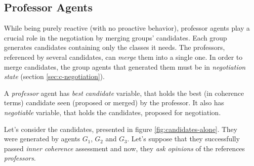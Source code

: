 \documentclass[../../ThesisDoc]{subfiles}
\begin{document}
\providecommand{\rootdir}{../..}




\subsection{Professor Agents}

While being purely reactive (with no proactive behavior), professor agents
play a crucial role in the negotiation by merging groups' candidates.
Each group generates candidates containing only the classes it needs.
The professors, referenced by several candidates, can \emph{merge} them into a
single one. In order to merge candidates, the group agents that generated them
must be in \emph{negotiation state} (section \ref{sec:c-negotiation}).

A \emph{professor} agent has \emph{best candidate} variable, that holds the best
(in coherence terms) candidate seen (proposed or merged) by the professor.
It also has \emph{negotiable} variable, that holds the candidates, proposed for
negotiation.

\bigskip

\noindent
Let's consider the candidates, presented in figure \ref{fig:candidates-alone}.
They were generated by agents $G_1$, $G_2$ and $G_3$. Let's suppose that they
successfully passed \emph{inner coherence} assessment and now, they \emph{ask opinions}
of the references \emph{professors}.




%
%
\end{document}
